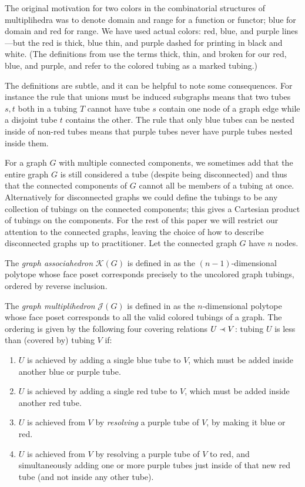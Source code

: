 \documentclass{article}
\newcommand{\precdot}{\prec\mathrel{\mkern-5mu}\mathrel{\cdot}}
\begin{document}
The original motivation for two colors in the combinatorial structures of multiplihedra was to denote domain and range for a function or functor; blue for domain and red for range. We have used actual colors: red, blue, and purple lines---but the red is thick, blue thin, and purple dashed for printing in black and white. (The definitions from \cite{dev-forc} use the terms thick, thin, and broken for our red, blue, and purple, and refer to the colored tubing as a marked tubing.)


The definitions are subtle, and it can be helpful to note some consequences. For instance the rule that unions must be induced subgraphs means that two tubes $s,t$ both in a tubing $T$ cannot have tube $s$ contain one node of a graph edge while a disjoint tube $t$ contains the other. The rule that only blue tubes can be nested inside of non-red tubes means that purple tubes never have purple tubes nested inside them. 

For a graph $G$ with multiple connected components, we sometimes add that the entire graph $G$ is still considered a tube (despite being disconnected) and thus that the connected components of $G$ cannot all be members of a tubing at once. Alternatively for disconnected graphs we could define the tubings to be any collection of tubings on the connected components; this gives a Cartesian product of tubings on the components. For the rest of this paper we will restrict our attention to the connected graphs, leaving the choice of how to describe disconnected graphs up to practitioner. Let the connected graph $G$ have $n$ nodes.
\begin{defn}
The \textit{graph associahedron} $\mathcal{K}(G)$ is defined in \cite{cd} as the $(n-1)$-dimensional polytope whose face poset corresponds precisely to the uncolored graph tubings, ordered by reverse inclusion. 
\end{defn}
\begin{defn}\label{multdef}
    The \textit{graph multiplihedron} $\mathcal{J}(G)$ is defined in \cite{dev-forc} as the $n$-dimensional polytope whose face poset  corresponds to all the valid colored tubings of a graph. The ordering is given by the following four covering relations $U\precdot V$: tubing $U$ is less than (covered by) tubing $V$ if:
\end{defn}

\begin{enumerate}
    \item $U$ is achieved by adding a single blue tube to $V$, which must be added inside another blue or purple tube. 
    \item $U$ is achieved by adding a single red tube to $V$, which must be added inside another red tube.
    \item $U$ is achieved from $V$ by \textit{resolving} a purple tube of $V$, by making it blue or red.
    \item $U$ is achieved from $V$ by resolving a purple tube of $V$ to red, and simultaneously adding one or more purple tubes just inside of that new red tube (and not inside any other tube).
\end{enumerate}
\end{document}
